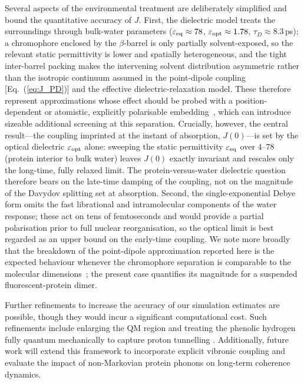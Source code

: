 \documentclass[journal=jpcbfk, manuscript=article, layout=twocolumn, doi=true]{achemso}
\begin{document}
{Several aspects of the environmental treatment are deliberately simplified and bound the quantitative accuracy of $J$. First, the dielectric model treats the surroundings through bulk-water parameters ($\varepsilon_{\rm eq}\approx 78$, $\varepsilon_{\rm opt}\approx 1.78$, $\tau_D\approx 8.3$\,ps); a chromophore enclosed by the $\beta$-barrel is only partially solvent-exposed, so the relevant static permittivity is lower and spatially heterogeneous, and the tight inter-barrel packing makes the intervening solvent distribution asymmetric rather than the isotropic continuum assumed in the point-dipole coupling [Eq.~(\ref{eq:J_PD})] and the effective dielectric-relaxation model. These therefore represent approximations whose effect should be probed with a position-dependent or atomistic, explicitly polarisable embedding~\cite{ozaydin2023unraveling, mennucci2012}, which can introduce sizeable additional screening at this separation. Crucially, however, the central result---the coupling imprinted at the instant of absorption, $J(0)$---is set by the optical dielectric $\varepsilon_{\rm opt}$ alone: sweeping the static permittivity $\varepsilon_{\rm eq}$ over $4$--$78$ (protein interior to bulk water) leaves $J(0)$ exactly invariant and rescales only the long-time, fully relaxed limit. The protein-versus-water dielectric question therefore bears on the late-time damping of the coupling, not on the magnitude of the Davydov splitting set at absorption. Second, the single-exponential Debye form omits the fast librational and intramolecular components of the water response; these act on tens of femtoseconds and would provide a partial polarisation prior to full nuclear reorganisation, so the optical limit is best regarded as an upper bound on the early-time coupling. We note more broadly that the breakdown of the point-dipole approximation reported here is the expected behaviour whenever the chromophore separation is comparable to the molecular dimensions~\cite{sobakinskaya2018theory, scholes2003}; the present case quantifies its magnitude for a suspended fluorescent-protein dimer.}

Further refinements to increase the accuracy of our simulation estimates are possible, though they would incur a significant computational cost. Such refinements include enlarging the QM region and treating the phenolic hydrogen fully quantum mechanically to capture proton tunnelling \cite{chakraborty2008development,bourne2024quantum}. Additionally, future work will extend this framework to incorporate explicit vibronic coupling and evaluate the impact of non-Markovian protein phonons on long-term coherence dynamics.
\end{document}
